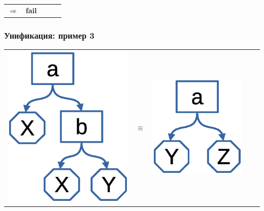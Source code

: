 \documentclass{../../slides-style}
\begin{document}
\begin{frame}
\begin{tabular}{m{25mm}cm{25mm}cm{25mm}}
    \textbf{\Huge $\Rightarrow$} &
    \pause \centering
    \vspace{-2mm}
    \textbf{\Huge fail}
    \end{tabular}
    \end{frame}

    \begin{frame}
        \frametitle{Унификация: пример 3}
    \begin{tabular}{m{25mm}cm{25mm}cm{25mm}}
    \includegraphics[scale=0.4]{term1.eps} &
    \textbf{\Huge $\equiv$} &
    \includegraphics[scale=0.4]{term3.eps} &

\end{tabular}
\end{frame}
\end{document}
